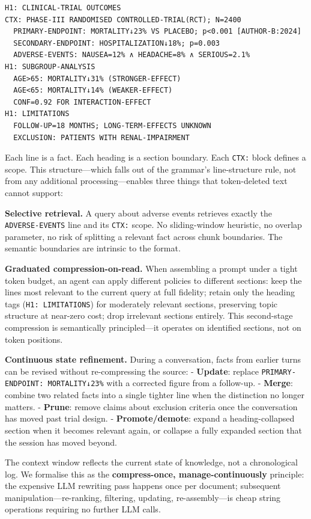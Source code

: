 \documentclass[
]{article}
\begin{document}
\begin{verbatim}
H1: CLINICAL-TRIAL OUTCOMES
CTX: PHASE-III RANDOMISED CONTROLLED-TRIAL(RCT); N=2400
  PRIMARY-ENDPOINT: MORTALITY↓23% VS PLACEBO; p<0.001 [AUTHOR-B:2024]
  SECONDARY-ENDPOINT: HOSPITALIZATION↓18%; p=0.003
  ADVERSE-EVENTS: NAUSEA=12% ∧ HEADACHE=8% ∧ SERIOUS=2.1%
H1: SUBGROUP-ANALYSIS
  AGE>65: MORTALITY↓31% (STRONGER-EFFECT)
  AGE<65: MORTALITY↓14% (WEAKER-EFFECT)
  CONF=0.92 FOR INTERACTION-EFFECT
H1: LIMITATIONS
  FOLLOW-UP=18 MONTHS; LONG-TERM-EFFECTS UNKNOWN
  EXCLUSION: PATIENTS WITH RENAL-IMPAIRMENT
\end{verbatim}

Each line is a fact. Each heading is a section boundary. Each
\texttt{CTX:} block defines a scope. This structure---which falls out of
the grammar's line-structure rule, not from any additional
processing---enables three things that token-deleted text cannot
support:

\textbf{Selective retrieval.} A query about adverse events retrieves
exactly the \texttt{ADVERSE-EVENTS} line and its \texttt{CTX:} scope. No
sliding-window heuristic, no overlap parameter, no risk of splitting a
relevant fact across chunk boundaries. The semantic boundaries are
intrinsic to the format.

\textbf{Graduated compression-on-read.} When assembling a prompt under a
tight token budget, an agent can apply different policies to different
sections: keep the lines most relevant to the current query at full
fidelity; retain only the heading tags (\texttt{H1:\ LIMITATIONS}) for
moderately relevant sections, preserving topic structure at near-zero
cost; drop irrelevant sections entirely. This second-stage compression
is semantically principled---it operates on identified sections, not on
token positions.

\textbf{Continuous state refinement.} During a conversation, facts from
earlier turns can be revised without re-compressing the source: -
\textbf{Update}: replace \texttt{PRIMARY-ENDPOINT:\ MORTALITY↓23\%} with
a corrected figure from a follow-up. - \textbf{Merge}: combine two
related facts into a single tighter line when the distinction no longer
matters. - \textbf{Prune}: remove claims about exclusion criteria once
the conversation has moved past trial design. - \textbf{Promote/demote}:
expand a heading-collapsed section when it becomes relevant again, or
collapse a fully expanded section that the session has moved beyond.

The context window reflects the current state of knowledge, not a
chronological log. We formalise this as the \textbf{compress-once,
manage-continuously} principle: the expensive LLM rewriting pass happens
once per document; subsequent manipulation---re-ranking, filtering,
updating, re-assembly---is cheap string operations requiring no further
LLM calls.
\end{document}
